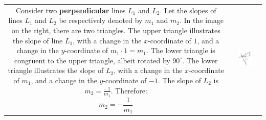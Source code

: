 \documentclass{article}
\begin{document}
\begin{tabular}{cc}
\parbox{0.5\textwidth}{
Consider two {\bf perpendicular} lines \(L_1\) and \(L_2\). Let the slopes of lines \(L_1\) and \(L_2\) be respectively denoted by \(m_1\) and \(m_2\). In the image on the right, there are two triangles. The upper triangle illustrates the slope of line \(L_1\), with a change in the \(x\)-coordinate of \(1\), and a change in the \(y\)-coordinate of \(m_1 \cdot 1 = m_1\). The lower triangle is congruent to the upper triangle, albeit rotated by \(90^\circ\). The lower triangle illustrates the slope of \(L_2\), with a change in the \(x\)-coordinate of \(m_1\), and a change in the \(y\)-coordinate of \(-1\). The slope of \(L_2\) is \(m_2 = \frac{-1}{m_1}\). Therefore:
\[m_2 = -\frac{1}{m_1}\]
} & \parbox{0.5\textwidth}{
\includegraphics[width = 0.5\textwidth]{perpendicular_slope}
}
\end{tabular}
\end{document}
